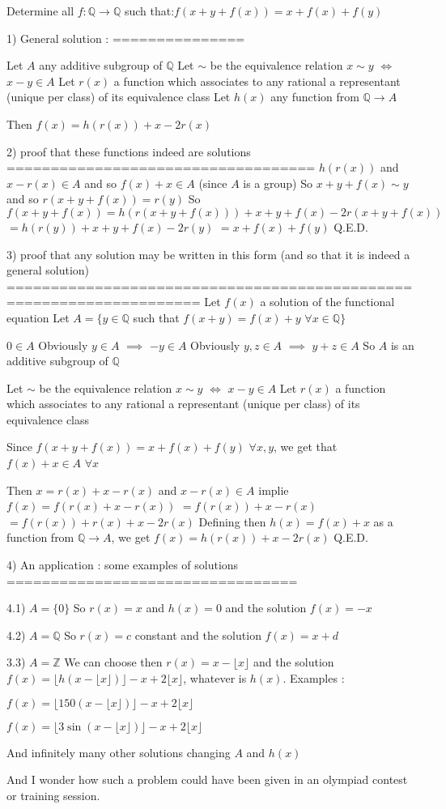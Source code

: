 \begin{solution}
	\begin{tcolorbox}Determine all $f:\mathbb{Q}\to\mathbb{Q}$ such that:$f(x+y+f(x))=x+f(x)+f(y)$\end{tcolorbox}
1) General solution :
===============

Let $A$ any additive subgroup of $\mathbb Q$
Let $\sim$ be the equivalence relation $x\sim y$ $\iff$ $x-y\in A$
Let $r(x)$ a function which associates to any rational a representant (unique per class) of its equivalence class
Let $h(x)$ any function from $\mathbb Q\to A$

Then $f(x)=h(r(x))+x-2r(x)$

2) proof that these functions indeed are solutions
===================================
$h(r(x))$ and $x-r(x)\in A$ and so $f(x)+x\in A$ (since $A$ is a group)
So $x+y+f(x)\sim y$ and so $r(x+y+f(x))=r(y)$
So $f(x+y+f(x))=h(r(x+y+f(x)))+x+y+f(x)-2r(x+y+f(x))$ $=h(r(y))+x+y+f(x)-2r(y)$ $=x+f(x)+f(y)$
Q.E.D.

3) proof that any solution may be written in this form (and so that it is indeed a general solution)
====================================================================
Let $f(x)$ a solution of the functional equation
Let $A=\{y\in\mathbb Q$ such that $f(x+y)=f(x)+y$ $\forall x\in\mathbb Q\}$

$0\in A$
Obviously $y\in A$ $\implies$ $-y\in A$
Obviously $y,z\in A$ $\implies$ $y+z\in A$
So $A$ is an additive subgroup of $\mathbb Q$

Let $\sim$ be the equivalence relation $x\sim y$ $\iff$ $x-y\in A$
Let $r(x)$ a function which associates to any rational a representant (unique per class) of its equivalence class

Since $f(x+y+f(x))=x+f(x)+f(y)$ $\forall x,y$, we get that $f(x)+x\in A$ $\forall x$

Then $x=r(x)+x-r(x)$ and $x-r(x)\in A$ implie $f(x)=f(r(x)+x-r(x))$ $=f(r(x))+x-r(x)$ $=f(r(x))+r(x)+x-2r(x)$
Defining then $h(x)=f(x)+x$ as a function from $\mathbb Q\to A$, we get $f(x)=h(r(x))+x-2r(x)$
Q.E.D.

4) An application : some examples of solutions
=================================

4.1) $A=\{0\}$
So $r(x)=x$ and $h(x)=0$ and the solution $\boxed{f(x)=-x}$

4.2) $A=\mathbb Q$
So $r(x)=c$ constant and the solution $\boxed{f(x)=x+d}$

3.3) $A=\mathbb Z$
We can choose then $r(x)=x-\lfloor x\rfloor$ and the solution $f(x)=\lfloor h(x-\lfloor x\rfloor)\rfloor -x+2\lfloor x\rfloor$, whatever is $h(x)$. Examples :

$\boxed{f(x)=\lfloor 150(x-\lfloor x\rfloor)\rfloor -x+2\lfloor x\rfloor}$

$\boxed{f(x)=\lfloor 3\sin(x-\lfloor x\rfloor)\rfloor -x+2\lfloor x\rfloor}$

And infinitely many other solutions changing $A$ and $h(x)$

And I wonder how such a problem could have been given in an olympiad contest or training session.
\end{solution}
